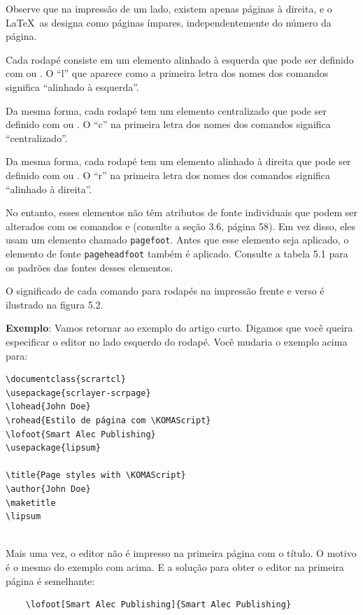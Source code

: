 Observe que na impressão de um lado, existem apenas páginas à direita, e o \LaTeX\ as designa como páginas ímpares, independentemente do número da página.

Cada rodapé consiste em um elemento alinhado à esquerda que pode ser definido com  ou . O “l” que aparece como a primeira letra dos nomes dos comandos significa “alinhado à esquerda”.

Da mesma forma, cada rodapé tem um elemento centralizado que pode ser definido com  ou . O “c” na primeira letra dos nomes dos comandos significa “centralizado”.

Da mesma forma, cada rodapé tem um elemento alinhado à direita que pode ser definido com  ou . O “r” na primeira letra dos nomes dos comandos significa “alinhado à direita”.

No entanto, esses elementos não têm atributos de fonte individuais que podem ser alterados com os comandos  e  (consulte a seção 3.6, página 58). Em vez disso, eles usam um elemento chamado \texttt{pa\-ge\-foot}. Antes que esse elemento seja aplicado, o elemento de fonte \texttt{pa\-ge\-head\-foot} também é aplicado. Consulte a tabela 5.1 para os padrões das fontes desses elementos.

O significado de cada comando para rodapés na impressão frente e verso é ilustrado na figura 5.2.

\textbf{Exemplo}: Vamos retornar ao exemplo do artigo curto. Digamos que você queira especificar o editor no lado esquerdo do rodapé. Você mudaria o exemplo acima para:

 \begin{verbatim}
\documentclass{scrartcl}
\usepackage{scrlayer-scrpage}
\lohead{John Doe}
\rohead{Estilo de página com \KOMAScript}
\lofoot{Smart Alec Publishing}
\usepackage{lipsum}

\title{Page styles with \KOMAScript}
\author{John Doe}
\maketitle
\lipsum
   
\end{verbatim}  

Mais uma vez, o editor não é impresso na primeira página com o título. O motivo é o mesmo do exemplo com  acima. E a solução para obter o editor na primeira página é semelhante:
\begin{verbatim}
    \lofoot[Smart Alec Publishing]{Smart Alec Publishing}
\end{verbatim}

